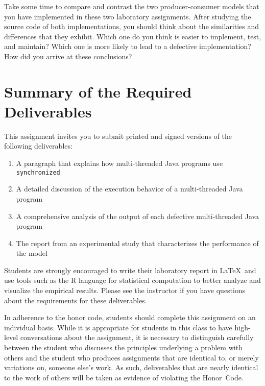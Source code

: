 Take some time to compare and contrast the two producer-consumer models that you have implemented in these two
laboratory assignments. After studying the source code of both implementations, you should think about the similarities
and differences that they exhibit.  Which one do you think is easier to implement, test, and maintain? Which one is more
likely to lead to a defective implementation? How did you arrive at these conclusions?

\section*{Summary of the Required Deliverables}

This assignment invites you to submit printed and signed versions of the following deliverables: 

\begin{enumerate} \item A paragraph that explains how multi-threaded Java programs use {\tt synchronized} \item A
    detailed discussion of the execution behavior of a multi-threaded Java program \item A comprehensive analysis of the
    output of each defective multi-threaded Java program \item The report from an experimental study that characterizes
    the performance of the model \end{enumerate}

Students are strongly encouraged to write their laboratory report in \LaTeX~and use tools such as the R language for
statistical computation to better analyze and visualize the empirical results. Please see the instructor if you have
questions about the requirements for these deliverables.

In adherence to the honor code, students should complete this assignment on an individual basis. While it is appropriate
for students in this class to have high-level conversations about the assignment, it is necessary to distinguish
carefully between the student who discusses the principles underlying a problem with others and the student who produces
assignments that are identical to, or merely variations on, someone else's work.  As such, deliverables that are nearly
identical to the work of others will be taken as evidence of violating the \mbox{Honor Code}.  



  
